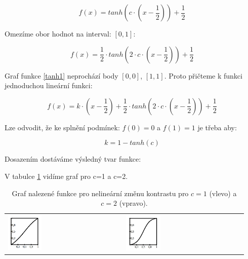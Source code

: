 \begin{equation}
f(x) = tanh(c\cdot(x-\frac{1}{2})) + \frac{1}{2}
\end{equation}

Omezíme obor hodnot na interval: $[0,1]$:

\begin{equation} \label{tanh1}
f(x) = \frac{1}{2}\cdot tanh(2\cdot c\cdot(x-\frac{1}{2})) + \frac{1}{2}
\end{equation}

Graf funkce \ref{tanh1} neprochází body $[0,0]$, $[1,1]$. Proto přičteme k funkci jednoduchou lineární funkci:

\begin{equation}
f(x) = k\cdot(x-\frac{1}{2}) + \frac{1}{2}\cdot tanh(2\cdot c\cdot(x-\frac{1}{2})) + \frac{1}{2}
\end{equation}

Lze odvodit, že ke splnění podmínek: $f(0)=0$ a $f(1)=1$ je třeba aby:

\begin{equation}
k = 1 - tanh(c)
\end{equation}

Dosazením dostáváme výsledný tvar funkce:

\begin{center}
\end{center}

V tabulce \ref{kontrast} vidíme graf pro c=1 a c=2.


\noindent
\begin{table}[ht]
	\label{kontrast}
	\centering
		\begin{tabular}{p{}p{}}
			\includegraphics[width=0.3\textwidth,height=0.3\textwidth]{Text/IMG/nelinearni1.jpg}
		&
			\includegraphics[width=0.3\textwidth,height=0.3\textwidth]{Text/IMG/nelinearni2.jpg}
		\end{tabular}
	\caption{Graf nalezené funkce pro nelineární změnu kontrastu pro $c=1$ (vlevo) a $c=2$ (vpravo).}
\end{table}


